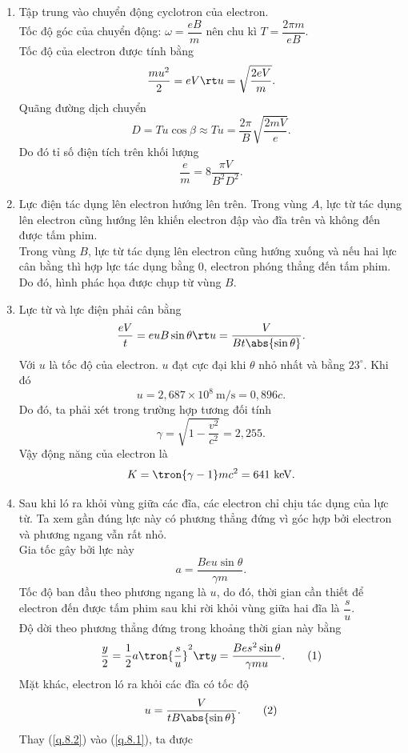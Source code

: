 \begin{loigiai}
\begin{enumerate}[1)]
    \item Tập trung vào chuyển động cyclotron của electron.\\
    Tốc độ góc của chuyển động:
    $\omega = \dfrac{eB}{m}$ nên chu kì $T = \dfrac{2\pi m}{eB}$.\\
    Tốc độ của electron được tính bằng
    \[\dfrac{mu^2}{2} = eV \rt u = \sqrt{\dfrac{2eV}{m}}.\]
    Quãng đường dịch chuyển 
    \[D = T u \cos \beta \approx T u = \dfrac{2\pi}{B} \sqrt{\dfrac{2mV}{e}}.\]
    Do đó tỉ số điện tích trên khối lượng
    \[\dfrac{e}{m} = 8 \dfrac{\pi V}{B^2 D^2}.\]
    \item  Lực điện tác dụng lên electron hướng lên trên. Trong vùng $A$, lực từ tác dụng lên electron cũng hướng lên khiến electron đập vào đĩa trên và không đến được tấm phim.\\
    Trong vùng $B$, lực từ tác dụng lên electron cũng hướng xuống và nếu hai lực cân bằng thì hợp lực tác dụng bằng $0$, electron phóng thẳng đến tấm phim.\\
    Do đó, hình phác họa được chụp từ vùng $B$.
    \item Lực từ và lực điện phải cân bằng
    \[\dfrac{eV}{t} = e u B \sin \theta  \rt u = \dfrac{V}{Bt \abs{\sin \theta}}.\]
    Với $u$ là tốc độ của electron. $u$ đạt cực đại khi $\theta$ nhỏ nhất và bằng $23^\circ$. Khi đó 
    \[u = 2,687 \times 10^8 ~\mathrm{m/s} = 0,896 c.\]
    Do đó, ta phải xét trong trường hợp tương đối tính 
    \[\gamma = \sqrt{1 - \dfrac{v^2}{c^2}} = 2,255.\]
    Vậy động năng của electron là
    \[K = \tron{\gamma - 1}mc^2 = 641 ~\mathrm{keV}.\]
    \item Sau khi ló ra khỏi vùng giữa các đĩa, các electron chỉ chịu tác dụng của lực từ. Ta xem gần đúng lực này có phương thẳng đứng vì góc  hợp  bởi electron và phương ngang vẫn rất nhỏ. \\
    Gia tốc gây bởi lực này
    \[a =  \dfrac{Beu \sin \theta}{\gamma m}.\]
    Tốc độ ban đầu theo phương ngang là $u$, do đó, thời gian cần thiết để electron đến được tấm phim sau khi rời khỏi vùng giữa hai đĩa là $\dfrac{s}{u}$.\\
    Độ dời theo phương thẳng đứng trong khoảng thời gian này bằng
    \[\dfrac{y}{2} = \dfrac{1}{2}a \tron{\dfrac{s}{u}}^2 \rt y = \dfrac{Bes^2 \sin \theta }{\gamma m u}.\tag{1}\label{q.8.1}\]
    Mặt khác, electron ló ra khỏi các đĩa có tốc độ
    \[u = \dfrac{V}{tB \abs{\sin \theta}} .\tag{2}\label{q.8.2}\]
    Thay (\ref{q.8.2}) vào (\ref{q.8.1}), ta được

\end{enumerate}
\end{loigiai}
